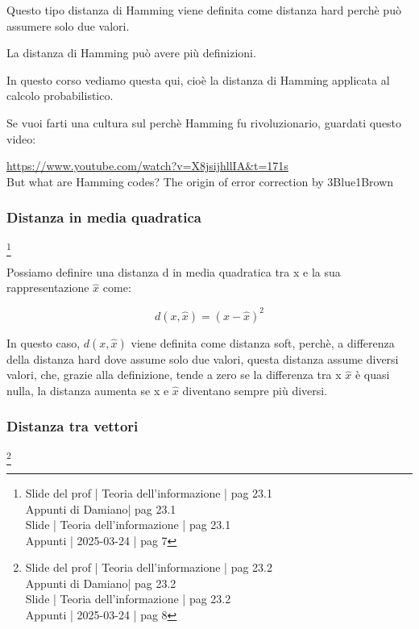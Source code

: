 Questo tipo distanza di Hamming viene definita come distanza hard perchè può assumere solo due valori. \newline 


\begin{tcolorbox}
    La distanza di Hamming può avere più definizioni. \newline 
    
    In questo corso vediamo questa qui, cioè la distanza di Hamming applicata al calcolo probabilistico. \newline  

    Se vuoi farti una cultura sul perchè Hamming fu rivoluzionario, guardati questo video: \newline 

    \url{https://www.youtube.com/watch?v=X8jsijhllIA&t=171s} \\
    But what are Hamming codes? The origin of error correction by 3Blue1Brown
\end{tcolorbox}

\newpage 

\subsubsection{Distanza in media quadratica}
\footnote{Slide del prof | Teoria dell'informazione | pag 23.1 \\ 
Appunti di Damiano| pag 23.1 \\
Slide | Teoria dell'informazione | pag 23.1 \\
Appunti | 2025-03-24 | pag 7
}

Possiamo definire una distanza d in media quadratica tra x e la sua rappresentazione $\hat{x}$ come: 

{
    \Large 
    \begin{equation}
        d (x, \hat{x}) = (x - \hat{x})^{2}
    \end{equation}
}

In questo caso, $d (x, \hat{x}) $ viene definita come distanza soft, perchè, a differenza della distanza hard dove assume solo due valori, 
questa distanza assume diversi valori, che, grazie alla definizione, tende a zero se la differenza tra x $\hat{x}$ è quasi nulla, 
la distanza aumenta se x e $\hat{x}$ diventano sempre più diversi. \newline 

\newpage 

\subsubsection{Distanza tra vettori}
\footnote{Slide del prof | Teoria dell'informazione | pag 23.2 \\  
Appunti di Damiano| pag 23.2 \\
Slide | Teoria dell'informazione | pag 23.2 \\
Appunti | 2025-03-24 | pag 8
}

